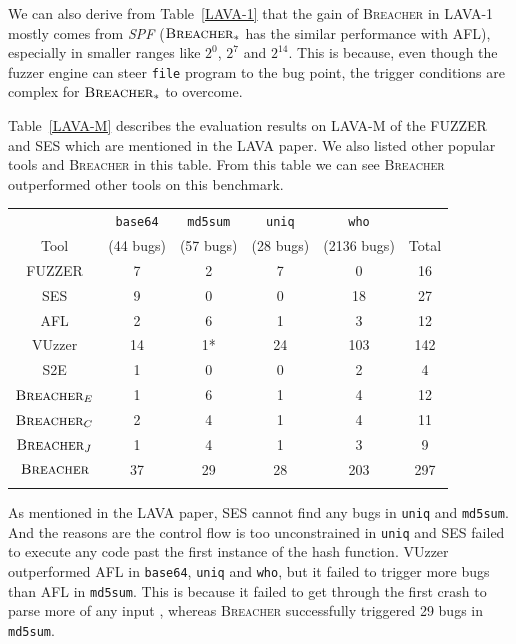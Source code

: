 \documentclass{cta-author}
\newcommand{\prototype}{\textsc{Breacher} }
\begin{document}
We can also derive from Table~\ref{LAVA-1} that the gain of \prototype in LAVA-1 mostly
comes from \textit{SPF} ($\prototype_*$ has the similar performance
with AFL), especially in smaller ranges like $2^0$, $2^7$ and $2^{14}$. 
This is because, even though the fuzzer engine can steer \texttt{file}
program to the bug point, the trigger conditions are complex for $\prototype_*$ to
overcome. 

Table~\ref{LAVA-M} describes the evaluation results on LAVA-M of the FUZZER 
and SES which are mentioned in the LAVA paper. We also listed other popular
tools and \prototype in this table. From this table we can see \prototype
outperformed other tools on this benchmark.

\begin{table}[!b]
	{\begin{tabular*}{20pc}{@{\extracolsep{\fill}}cccccc@{}}\toprule
			& \texttt{base64} & \texttt{md5sum} & \texttt{uniq} & \texttt{who} &   \\
			Tool    & (44 bugs) & (57 bugs) & (28 bugs) & (2136 bugs) &  Total\\
			\midrule
			FUZZER 				& 7  & 2  & 7    & 0   & 16  \\
			SES	        		& 9  & 0  & 0    & 18  & 27  \\
			AFL         		& 2  & 6  & 1    & 3   & 12   \\
			VUzzer				& 14 & 1* & 24   & 103 & 142 \\
			S2E         		& 1  & 0  & 0    & 2   & 4   \\
			$\prototype_{E}$	& 1  & 6  & 1    & 4   & 12 \\
			$\prototype_{C}$	& 2  & 4  & 1    & 4   & 11 \\
			$\prototype_{J}$	& 1  & 4  & 1    & 3   & 9 \\
			$\prototype$		& 37 & 29 & 28   & 203 & 297 \\
			\botrule
		\end{tabular*}}{}
	\end{table}

As mentioned in the LAVA paper, SES cannot find any bugs in \texttt{uniq} and 
\texttt{md5sum}. And the reasons are the control flow is too unconstrained in 
\texttt{uniq} and SES failed to execute any code past the first instance of 
the hash function. 
VUzzer outperformed AFL in \texttt{base64}, \texttt{uniq} and \texttt{who}, 
but it failed to trigger more bugs than AFL in \texttt{md5sum}. 
This is because it failed to get through the first crash to parse more of any input \cite{rawat2017vuzzer}, whereas \prototype successfully triggered 29 bugs in 
\texttt{md5sum}.
\end{document}
